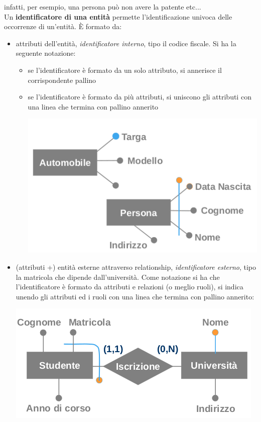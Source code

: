 \documentclass[a4paper,12pt, oneside]{book}
\begin{document}
infatti, per esempio, una persona può non avere la patente etc...\\
Un \textbf{identificatore di una entità} permette l'identificazione univoca delle occorrenze di un'entità. È formato da:
\begin{itemize}
\item attributi dell'entità, \textit{identificatore interno}, tipo il codice fiscale. Si ha la seguente notazione:
\begin{itemize}
\item se l'identificatore è formato da un solo attributo, si annerisce il corrispondente pallino
\item se l'identificatore è formato da più attributi, si uniscono gli attributi con una linea che termina con pallino annerito
\begin{center}
\includegraphics[scale=0.8]{img/er12.png}
\end{center}
\end{itemize}
\item (attributi +) entità esterne attraverso
relationship, \textit{identificatore esterno}, tipo la matricola che dipende dall'università. Come notazione si ha che l'identificatore è formato da attributi e relazioni (o meglio ruoli), si indica unendo gli attributi ed i ruoli con una linea che termina con pallino annerito:
\begin{center}
\includegraphics[scale=0.8]{img/er13.png}
\end{center}
\end{itemize}
\end{document}
